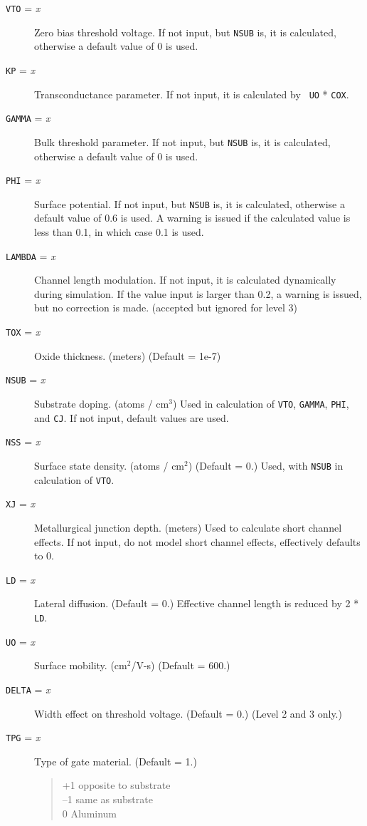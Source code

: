\begin{description}

\item[{\tt VTO} = {\it x}]
Zero bias threshold voltage.  If not input, but {\tt NSUB} is, it is
calculated, otherwise a default value of 0 is used.

\item[{\tt KP} = {\it x}]
Transconductance parameter.  If not input, it is calculated by {\tt
UO} * {\tt COX}.

\item[{\tt GAMMA} = {\it x}]
Bulk threshold parameter.  If not input, but {\tt NSUB} is, it is
calculated, otherwise a default value of 0 is used.

\item[{\tt PHI} = {\it x}]
Surface potential.  If not input, but {\tt NSUB} is, it is calculated,
otherwise a default value of 0.6 is used.  A warning is issued if the
calculated value is less than 0.1, in which case 0.1 is used.

\item[{\tt LAMBDA} = {\it x}]
Channel length modulation.  If not input, it is calculated dynamically
during simulation.  If the value input is larger than 0.2, a warning
is issued, but no correction is made.  (accepted but ignored for level
3)

\item[{\tt TOX} = {\it x}]
Oxide thickness. (meters) (Default = 1e-7)

\item[{\tt NSUB} = {\it x}]
Substrate doping.  (atoms / cm$^3$) Used in calculation of {\tt VTO},
{\tt GAMMA}, {\tt PHI}, and {\tt CJ}.  If not input, default values
are used.

\item[{\tt NSS} = {\it x}]
Surface state density.  (atoms / cm$^2$) (Default = 0.) Used, with
{\tt NSUB} in calculation of {\tt VTO}.

\item[{\tt XJ} = {\it x}]
Metallurgical junction depth. (meters) Used to calculate short channel
effects.  If not input, do not model short channel effects,
effectively defaults to 0.

\item[{\tt LD} = {\it x}]
Lateral diffusion. (Default = 0.)  Effective channel length is reduced
by 2 * {\tt LD}.

\item[{\tt UO} = {\it x}]
Surface mobility. (cm$^2$/V-s) (Default = 600.)

\item[{\tt DELTA} = {\it x}]
Width effect on threshold voltage.  (Default = 0.)  (Level 2 and 3
only.)

\item[{\tt TPG} = {\it x}]
Type of gate material. (Default = 1.)
\begin{verse}
+1 opposite to substrate\\
--1 same as substrate\\
0 Aluminum
\end{verse}

\end{description}
